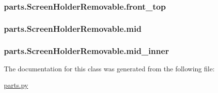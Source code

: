 \subsubsection[{front\+\_\+top}]{\setlength{\rightskip}{0pt plus 5cm}parts.\+Screen\+Holder\+Removable.\+front\+\_\+top}\label{classparts_1_1_screen_holder_removable_ad35d5ab861b1c9235ce85f9983df2fe5}
\hypertarget{classparts_1_1_screen_holder_removable_af1e5f3e16411c642f41ea631f697a425}{}
\subsubsection[{mid}]{\setlength{\rightskip}{0pt plus 5cm}parts.\+Screen\+Holder\+Removable.\+mid}\label{classparts_1_1_screen_holder_removable_af1e5f3e16411c642f41ea631f697a425}
\hypertarget{classparts_1_1_screen_holder_removable_abda61ab8d911e57fc44cab7154c18f34}{}
\subsubsection[{mid\+\_\+inner}]{\setlength{\rightskip}{0pt plus 5cm}parts.\+Screen\+Holder\+Removable.\+mid\+\_\+inner}\label{classparts_1_1_screen_holder_removable_abda61ab8d911e57fc44cab7154c18f34}


The documentation for this class was generated from the following file\+:\begin{DoxyCompactItemize}
\item 
\hyperlink{parts_8py}{parts.\+py}\end{DoxyCompactItemize}
